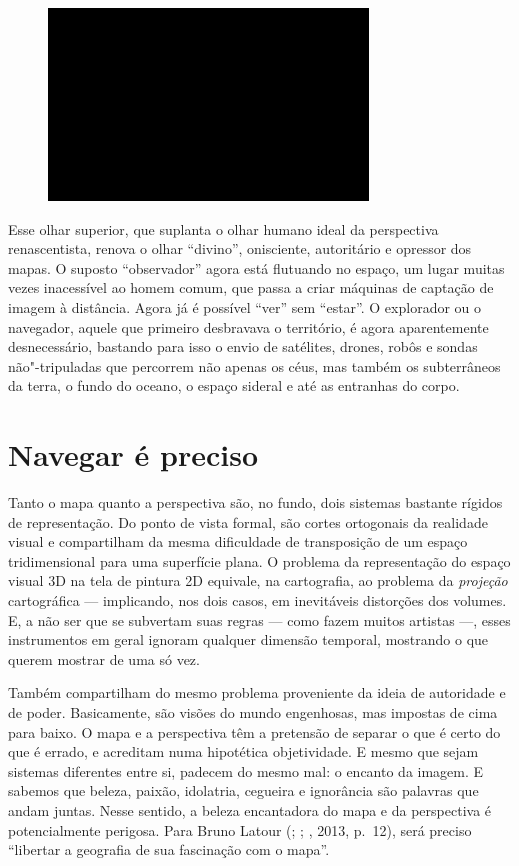 \begin{figure}[!ht]
\centering
 \includegraphics[width=85mm]{./imgs/im1.jpg}
\caption{\tiny{}}
\end{figure}

Esse olhar superior, que suplanta o olhar humano ideal da perspectiva
renascentista, renova o olhar ``divino'', onisciente, autoritário e
opressor dos mapas. O suposto ``observador'' agora está flutuando no
espaço, um lugar muitas vezes inacessível ao homem comum, que passa a
criar máquinas de captação de imagem à distância. Agora já é possível
``ver'' sem ``estar''. O explorador ou o navegador, aquele que primeiro
desbravava o território, é agora aparentemente desnecessário, bastando
para isso o envio de satélites, drones, robôs e sondas não"-tripuladas
que percorrem não apenas os céus, mas também os subterrâneos da terra, o
fundo do oceano, o espaço sideral e até as entranhas do corpo.

\chapter{Navegar é preciso}

Tanto o mapa quanto a perspectiva são, no fundo, dois sistemas bastante
rígidos de representação. Do ponto de vista formal, são cortes
ortogonais da realidade visual e compartilham da mesma dificuldade de
transposição de um espaço tridimensional para uma superfície plana. O
problema da representação do espaço visual 3D na tela de pintura 2D
equivale, na cartografia, ao problema da \emph{projeção} cartográfica
--- implicando, nos dois casos, em inevitáveis distorções dos volumes.
E, a não ser que se subvertam suas regras --- como fazem muitos artistas
---, esses instrumentos em geral ignoram qualquer dimensão temporal,
mostrando o que querem mostrar de uma só vez.

Também compartilham do mesmo problema proveniente da ideia de autoridade
e de poder. Basicamente, são visões do mundo engenhosas, mas impostas de
cima para baixo. O mapa e a perspectiva têm a pretensão de separar o que
é certo do que é errado, e acreditam numa hipotética objetividade. E
mesmo que sejam sistemas diferentes entre si, padecem do mesmo mal: o
encanto da imagem. E sabemos que beleza, paixão, idolatria, cegueira e
ignorância são palavras que andam juntas. Nesse sentido, a beleza
encantadora do mapa e da perspectiva é potencialmente perigosa. Para
Bruno Latour (; ; , 2013, p.~12), será
preciso ``libertar a geografia de sua fascinação com o mapa''.


